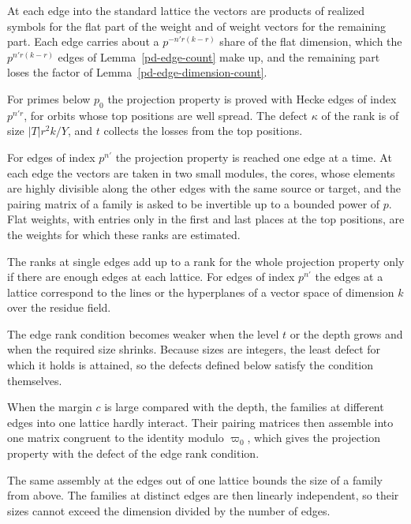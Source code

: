 At each edge into the standard lattice the vectors are products of realized symbols for the flat part
of the weight and of weight vectors for the remaining part. Each edge carries about a
$p^{-n'r(k-r)}$ share of the flat dimension, which the $p^{n'r(k-r)}$ edges of
Lemma~\ref{pd-edge-count} make up, and the remaining part loses the factor of
Lemma~\ref{pd-edge-dimension-count}.

For primes below $p_0$ the projection property is proved with Hecke edges of index $p^{n'r}$, for
orbits whose top positions are well spread. The defect $\kappa$ of the rank is of size $|T|r^2k/Y$,
and $t$ collects the losses from the top positions.

For edges of index $p^{n'}$ the projection property is reached one edge at a time. At each edge the
vectors are taken in two small modules, the cores, whose elements are highly divisible along the
other edges with the same source or target, and the pairing matrix of a family is asked to be
invertible up to a bounded power of $p$. Flat weights, with entries only in the first and last
places at the top positions, are the weights for which these ranks are estimated.

The ranks at single edges add up to a rank for the whole projection property only if there are
enough edges at each lattice. For edges of index $p^{n'}$ the edges at a lattice correspond to the
lines or the hyperplanes of a vector space of dimension $k$ over the residue field.

The edge rank condition becomes weaker when the level $t$ or the depth grows and when the required
size shrinks. Because sizes are integers, the least defect for which it holds is attained, so the
defects defined below satisfy the condition themselves.

When the margin $c$ is large compared with the depth, the families at different edges into one
lattice hardly interact. Their pairing matrices then assemble into one matrix congruent to the
identity modulo $\varpi_0$, which gives the projection property with the defect of the edge rank
condition.

The same assembly at the edges out of one lattice bounds the size of a family from above. The
families at distinct edges are then linearly independent, so their sizes cannot exceed the
dimension divided by the number of edges.


